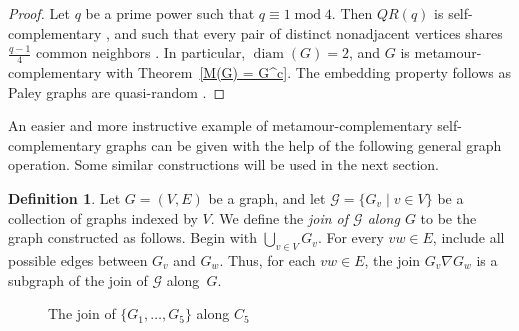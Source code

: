 \documentclass[12pt]{amsart}
\theoremstyle{definition}
\newtheorem{definition}[theorem]{Definition}
\theoremstyle{remark}
\numberwithin{equation}{section}
\numberwithin{figure}{section}
\renewcommand{\mod}{\operatorname{mod}}
\newcommand{\diam}{\operatorname{diam}}
\begin{document}
\begin{proof}
    Let $q$ be a prime power such that $q\equiv 1 \mod{4}$. Then $QR(q)$ is self-complementary \cite{Sachs}, and such that every pair of distinct nonadjacent vertices shares $\frac{q-1}4$ common neighbors \cite[Section~10.3]{GodsilRoyle}. In particular, $\diam(G)=2$, and $G$ is metamour-complementary with Theorem~\ref{M(G) = G^c}. The embedding property follows as Paley graphs are quasi-random   \cite{ChungGrahamWilson}.
\end{proof}

An easier and more instructive example of metamour-complementary self-complementary graphs can be given with the help of the following general graph operation. Some similar constructions will be used in the next section.

\begin{definition} \label{def: join of graphs along a graph}
    Let $G = (V,E)$ be a graph, and let $\mathcal{G}=\{G_v \mid v\in V\}$ be a collection of graphs indexed by $V$. We define the \emph{join of $\mathcal{G}$ along $G$} to be the graph constructed as follows. Begin with $\bigcup_{v\in V} G_v$. For every $vw\in E$, include all possible edges between $G_v$ and $G_w$.
    Thus, for each $vw\in E$, the join $G_v \nabla G_w$ is a subgraph of the join of $\mathcal{G}$ along~$G$.
\end{definition}

\begin{figure}[h!]
            \begin{center}
            \end{center}
            \caption{The join of $\{G_1, \ldots, G_5\}$ along $C_5$}
            \label{fig: join along C5}
        \end{figure}  
\end{document}
